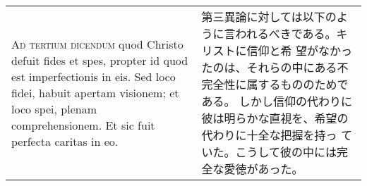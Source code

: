 \documentclass[10pt]{jsarticle}
\begin{document}
\begin{longtable}{p{21em}p{21em}}
\\

{\scshape Ad tertium dicendum} quod Christo defuit fides et spes,
propter id quod est imperfectionis in eis. Sed loco fidei, habuit
apertam visionem; et loco spei, plenam comprehensionem. Et sic fuit
perfecta caritas in eo.

&


 第三異論に対しては以下のように言われるべきである。キリストに信仰と希
 望がなかったのは、それらの中にある不完全性に属するもののためである。
 しかし信仰の代わりに彼は明らかな直視を、希望の代わりに十全な把握を持っ
 ていた。こうして彼の中には完全な愛徳があった。

\end{longtable}
\end{document}
